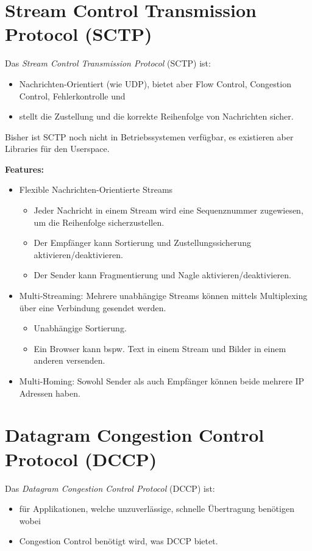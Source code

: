 \documentclass[a4paper, 11pt, accentcolor = tud3b]{tudreport}
\begin{document}
        \section{Stream Control Transmission Protocol (SCTP)}
            Das \textit{Stream Control Transmission Protocol} (SCTP) ist:
            \begin{itemize}
            	\item Nachrichten-Orientiert (wie UDP), bietet aber Flow Control, Congestion Control, Fehlerkontrolle und
            	\item stellt die Zustellung und die korrekte Reihenfolge von Nachrichten sicher.
            \end{itemize}
            
            Bisher ist SCTP noch nicht in Betriebssystemen verfügbar, es existieren aber Libraries für den Userspace.
            
            \textbf{Features:}
            \begin{itemize}
            	\item Flexible Nachrichten-Orientierte Streams
	            	\begin{itemize}
	            		\item Jeder Nachricht in einem Stream wird eine Sequenznummer zugewiesen, um die Reihenfolge sicherzustellen.
	            		\item Der Empfänger kann Sortierung und Zustellungssicherung aktivieren/deaktivieren.
	            		\item Der Sender kann Fragmentierung und Nagle aktivieren/deaktivieren.
	            	\end{itemize}
	            \item Multi-Streaming: Mehrere unabhängige Streams können mittels Multiplexing über eine Verbindung gesendet werden.
		            \begin{itemize}
		            	\item Unabhängige Sortierung.
		            	\item Ein Browser kann bspw. Text in einem Stream und Bilder in einem anderen versenden.
		            \end{itemize}
			    \item Multi-Homing: Sowohl Sender als auch Empfänger können beide mehrere IP Adressen haben.
            \end{itemize}

        \section{Datagram Congestion Control Protocol (DCCP)}
            Das \textit{Datagram Congestion Control Protocol} (DCCP) ist:
            \begin{itemize}
            	\item für Applikationen, welche unzuverlässige, schnelle Übertragung benötigen wobei
            	\item Congestion Control benötigt wird, was DCCP bietet.
            \end{itemize}
            
\end{document}

